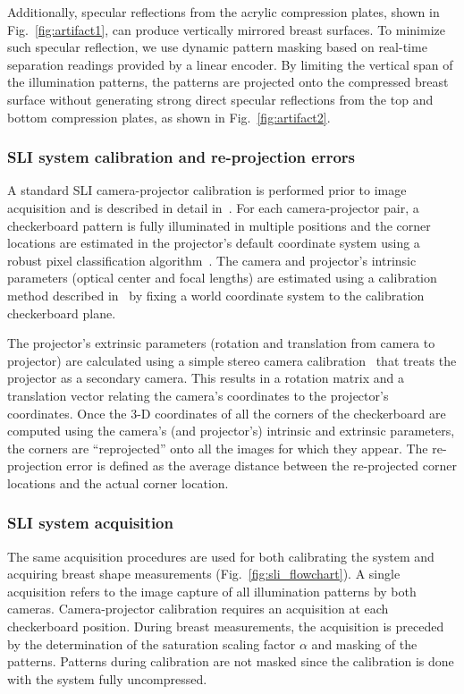 Additionally, specular reflections from the acrylic compression plates, shown in Fig.~\ref{fig:artifact1}, can produce vertically mirrored breast surfaces. To minimize such specular reflection, we use dynamic pattern masking based on real-time separation readings provided by a linear encoder. By limiting the vertical span of the illumination patterns, the patterns are projected onto the compressed breast surface without generating strong direct specular reflections from the top and bottom compression plates, as shown in Fig.~\ref{fig:artifact2}.

\subsubsection{SLI system calibration and re-projection errors}
A standard \ac{SLI} camera-projector calibration is performed prior to image acquisition and is described in detail in~\cite{Moreno2012}. For each camera-projector pair, a checkerboard pattern is fully illuminated in multiple positions and the corner locations are estimated in the projector's default coordinate system using a robust pixel classification algorithm~\cite{Xu2007}. The camera and projector's intrinsic parameters (optical center and focal lengths) are estimated using a calibration method described in~\cite{Zhang2000} by fixing a world coordinate system to the calibration checkerboard plane. 

The projector's extrinsic parameters (rotation and translation from camera to projector) are calculated using a simple stereo camera calibration~\cite{Bouguet2004} that treats the projector as a secondary camera. This results in a rotation matrix and a translation vector relating the camera's coordinates to the projector's coordinates. Once the 3-D coordinates of all the corners of the checkerboard are computed using the camera's (and projector's) intrinsic and extrinsic parameters, the corners are ``reprojected'' onto all the images for which they appear. The re-projection error is defined as the average distance between the re-projected corner locations and the actual corner location. 

\subsubsection{SLI system acquisition}
The same acquisition procedures are used for both calibrating the system and acquiring breast shape measurements (Fig.~\ref{fig:sli_flowchart}). A single acquisition refers to the image capture of all illumination patterns by both cameras. Camera-projector calibration requires an acquisition at each checkerboard position. During breast measurements, the acquisition is preceded by the determination of the saturation scaling factor $\alpha$ and masking of the patterns. Patterns during calibration are not masked since the calibration is done with the system fully uncompressed. 

